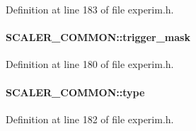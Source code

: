 Definition at line 183 of file experim.h.
\paragraph[{trigger\_\-mask}]{ {\bf SCALER\_\-COMMON::trigger\_\-mask}}\hfill\label{structSCALER__COMMON_aa210b32a68ef454d8aeefe5cfd33923b}


Definition at line 180 of file experim.h.
\paragraph[{type}]{ {\bf SCALER\_\-COMMON::type}}\hfill\label{structSCALER__COMMON_ab5f122ebc4286343f1fb4d1370d436f7}


Definition at line 182 of file experim.h.